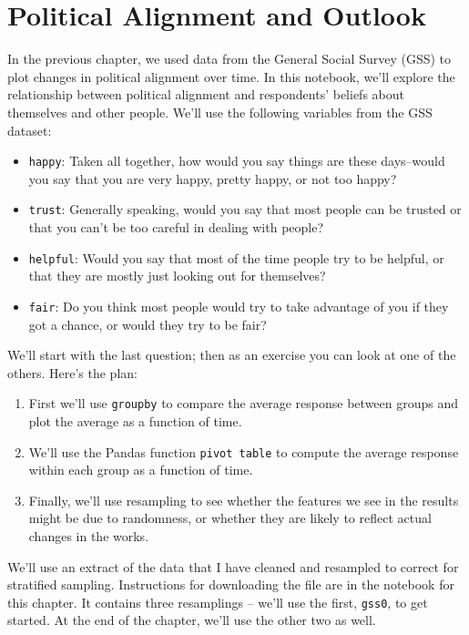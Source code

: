 \chapter{Political Alignment and
Outlook}\label{political-alignment-and-outlook}

In the previous chapter, we used data from the General Social Survey
(GSS) to plot changes in political alignment over time. In this
notebook, we'll explore the relationship between political alignment and
respondents' beliefs about themselves and other people. We'll use the
following variables from the GSS dataset:

\begin{itemize}
\item
  \passthrough{\lstinline!happy!}: Taken all together, how would you say
  things are these days--would you say that you are very happy, pretty
  happy, or not too happy?
\item
  \passthrough{\lstinline!trust!}: Generally speaking, would you say
  that most people can be trusted or that you can't be too careful in
  dealing with people?
\item
  \passthrough{\lstinline!helpful!}: Would you say that most of the time
  people try to be helpful, or that they are mostly just looking out for
  themselves?
\item
  \passthrough{\lstinline!fair!}: Do you think most people would try to
  take advantage of you if they got a chance, or would they try to be
  fair?
\end{itemize}

We'll start with the last question; then as an exercise you can look at
one of the others. Here's the plan:

\begin{enumerate}
\def\labelenumi{\arabic{enumi}.}
\item
  First we'll use \passthrough{\lstinline!groupby!} to compare the
  average response between groups and plot the average as a function of
  time.
\item
  We'll use the Pandas function \passthrough{\lstinline!pivot table!} to
  compute the average response within each group as a function of time.
\item
  Finally, we'll use resampling to see whether the features we see in
  the results might be due to randomness, or whether they are likely to
  reflect actual changes in the works.
\end{enumerate}

We'll use an extract of the data that I have cleaned and resampled to
correct for stratified sampling. Instructions for downloading the file
are in the notebook for this chapter. It contains three resamplings --
we'll use the first, \passthrough{\lstinline!gss0!}, to get started. At
the end of the chapter, we'll use the other two as well.

